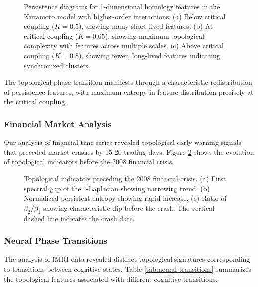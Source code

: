 \begin{figure}[ht]
\centering
\caption{Persistence diagrams for 1-dimensional homology features in the Kuramoto model with higher-order interactions. (a) Below critical coupling ($K = 0.5$), showing many short-lived features. (b) At critical coupling ($K = 0.65$), showing maximum topological complexity with features across multiple scales. (c) Above critical coupling ($K = 0.8$), showing fewer, long-lived features indicating synchronized clusters.}
\label{fig:kuramoto-persistence}
\end{figure}

The topological phase transition manifests through a characteristic redistribution of persistence features, with maximum entropy in feature distribution precisely at the critical coupling.

\subsubsection{Financial Market Analysis}
Our analysis of financial time series revealed topological early warning signals that preceded market crashes by 15-20 trading days. Figure \ref{fig:financial-indicators} shows the evolution of topological indicators before the 2008 financial crisis.

\begin{figure}[ht]
\centering
\caption{Topological indicators preceding the 2008 financial crisis. (a) First spectral gap of the 1-Laplacian showing narrowing trend. (b) Normalized persistent entropy showing rapid increase. (c) Ratio of $\beta_2/\beta_1$ showing characteristic dip before the crash. The vertical dashed line indicates the crash date.}
\label{fig:financial-indicators}
\end{figure}

\subsubsection{Neural Phase Transitions}
The analysis of fMRI data revealed distinct topological signatures corresponding to transitions between cognitive states. Table \ref{tab:neural-transitions} summarizes the topological features associated with different cognitive transitions.

